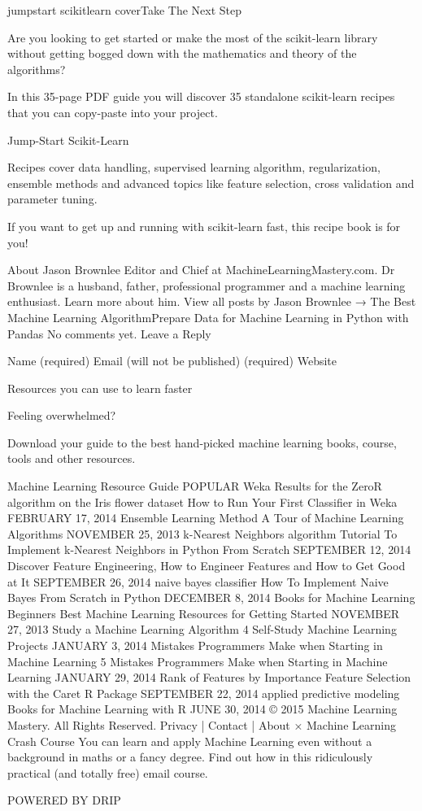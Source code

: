 \documentclass[12pt]{article}
\begin{document}
jumpstart scikitlearn coverTake The Next Step

Are you looking to get started or make the most of the scikit-learn library without getting bogged down with the mathematics and theory of the algorithms?

In this 35-page PDF guide you will discover 35 standalone scikit-learn recipes that you can copy-paste into your project.

Jump-Start Scikit-Learn

Recipes cover data handling, supervised learning algorithm, regularization, ensemble methods and advanced topics like feature selection, cross validation and parameter tuning.

If you want to get up and running with scikit-learn fast, this recipe book is for you!


About Jason Brownlee
Editor and Chief at MachineLearningMastery.com. Dr Brownlee is a husband, father, professional programmer and a machine learning enthusiast. Learn more about him.
View all posts by Jason Brownlee →
The Best Machine Learning AlgorithmPrepare Data for Machine Learning in Python with Pandas 
No comments yet.
Leave a Reply

Name (required)
Email (will not be published) (required)
Website



Resources you can use to learn faster

Feeling overwhelmed?

Download your guide to the best hand-picked machine learning books, course, tools and other resources.

Machine Learning Resource Guide
POPULAR
Weka Results for the ZeroR algorithm on the Iris flower dataset How to Run Your First Classifier in Weka
FEBRUARY 17, 2014
Ensemble Learning Method A Tour of Machine Learning Algorithms
NOVEMBER 25, 2013
k-Nearest Neighbors algorithm Tutorial To Implement k-Nearest Neighbors in Python From Scratch
SEPTEMBER 12, 2014
Discover Feature Engineering, How to Engineer Features and How to Get Good at It
SEPTEMBER 26, 2014
naive bayes classifier How To Implement Naive Bayes From Scratch in Python
DECEMBER 8, 2014
Books for Machine Learning Beginners Best Machine Learning Resources for Getting Started
NOVEMBER 27, 2013
Study a Machine Learning Algorithm 4 Self-Study Machine Learning Projects
JANUARY 3, 2014
Mistakes Programmers Make when Starting in Machine Learning 5 Mistakes Programmers Make when Starting in Machine Learning
JANUARY 29, 2014
Rank of Features by Importance Feature Selection with the Caret R Package
SEPTEMBER 22, 2014
applied predictive modeling Books for Machine Learning with R
JUNE 30, 2014
© 2015 Machine Learning Mastery. All Rights Reserved.
Privacy | Contact | About
×
Machine Learning Crash Course
You can learn and apply Machine Learning even without a background in maths or a fancy degree. Find out how in this ridiculously practical (and totally free) email course.


POWERED BY DRIP

%
%
%
\end{document}
